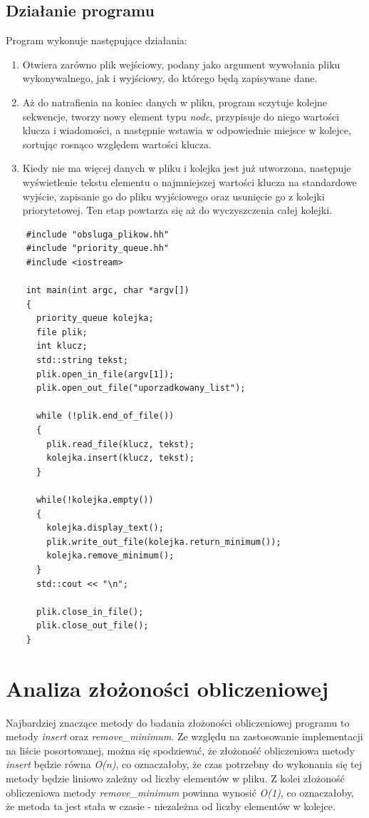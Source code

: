 \documentclass[12pt]{article}
\begin{document}
\subsection{Działanie programu}
Program wykonuje następujące działania:
\begin{enumerate}
    \item Otwiera zarówno plik wejściowy, podany jako argument wywołania pliku wykonywalnego, 
    jak i wyjściowy, do którego będą zapisywane dane.
    \item Aż do natrafienia na koniec danych w pliku, program sczytuje kolejne sekwencje, 
    tworzy nowy element typu \textit{node}, przypisuje do niego wartości klucza i wiadomości,
    a następnie wstawia w odpowiednie miejsce w kolejce, sortując rosnąco względem wartości klucza.  
    \item Kiedy nie ma więcej danych w pliku i kolejka jest już utworzona, następuje wyświetlenie
    tekstu elementu o najmniejszej wartości klucza na standardowe wyjście, zapisanie go do pliku 
    wyjściowego oraz usunięcie go z kolejki priorytetowej. Ten etap powtarza się aż do wyczyszczenia 
    całej kolejki.   
\end{enumerate}

\begin{lstlisting}
    #include "obsluga_plikow.hh"
    #include "priority_queue.hh"
    #include <iostream>
    
    int main(int argc, char *argv[])
    {
      priority_queue kolejka;
      file plik;
      int klucz;
      std::string tekst;
      plik.open_in_file(argv[1]);
      plik.open_out_file("uporzadkowany_list");
    
      while (!plik.end_of_file())
      {
        plik.read_file(klucz, tekst);
        kolejka.insert(klucz, tekst);
      }
      
      while(!kolejka.empty())
      {
        kolejka.display_text();
        plik.write_out_file(kolejka.return_minimum());
        kolejka.remove_minimum();
      }
      std::cout << "\n";
    
      plik.close_in_file();
      plik.close_out_file();
    }
\end{lstlisting}


\section{Analiza złożoności obliczeniowej}
Najbardziej znaczące metody do badania złożoności obliczeniowej programu to metody 
\textit{insert} oraz \textit{remove\_minimum}. Ze względu na zastosowanie implementacji 
na liście posortowanej, można się spodziewać, że złożoność obliczeniowa metody 
\textit{insert} będzie równa \textit{O(n)}, co oznaczałoby, że czas potrzebny do wykonania 
się tej metody będzie liniowo zależny od liczby elementów w pliku.
Z kolei złożoność obliczeniowa metody \textit{remove\_minimum} powinna wynosić \textit{O(1)}, 
co oznaczałoby, że metoda ta jest stała w czasie - niezależna od liczby elementów w kolejce.
\end{document}
